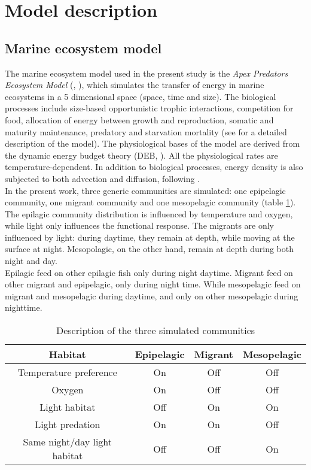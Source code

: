 \section{Model description}

\subsection{Marine ecosystem model}

The marine ecosystem model used in the present study is the \emph{Apex Predators Ecosystem Model} (\ap, \citealt{mauryModelingEnvironmentalEffects2007,mauryOverviewAPECOSMSpatialized2010}), which simulates 
the transfer of energy in marine ecosystems in a 5 dimensional space (space, time and size).
The biological processes include size-based opportunistic trophic interactions, competition for food, allocation of energy between growth and reproduction, somatic and maturity maintenance, predatory and starvation mortality (see \citealt{mauryModelingEnvironmentalEffects2007} for a detailed description of the model).
The physiological bases of the model are derived from the dynamic energy budget theory (DEB, \citealt{kooijmanDynamicEnergyMass2000}).
All the physiological rates are temperature-dependent.  In addition to biological processes, energy density 
is also subjected to both advection and diffusion, following \cite{faugerasAdvectiondiffusionreactionSizestructuredFish2005}.\\

In the present work, three generic communities are simulated: one epipelagic community, one migrant community and one mesopelagic community (table \ref{t:com-habitat}). 
The epilagic community distribution is influenced by temperature and oxygen, while light only influences the functional response. The 
migrants are only influenced by light: during daytime, they remain at depth, while moving at the 
surface at night. Mesopolagic, on the other hand, remain at depth during both night and day.\\

Epilagic feed on other epilagic fish only during night daytime. Migrant feed on other migrant and epipelagic, only during night time. While mesopelagic feed on migrant and mesopelagic during daytime, and only on other mesopelagic during nighttime. \\

\begin{table}
\begin{tabular}{cccc}
     Habitat & Epipelagic & Migrant & Mesopelagic \\
     \hline
     \hline
      Temperature preference & On & Off & Off\\
      Oxygen & On & Off & Off \\
      Light habitat & Off & On & On \\
      Light predation & On & On & Off \\
      Same night/day light habitat  & Off & Off & On \\
\end{tabular}
\caption{Description of the three simulated communities}
\label{t:com-habitat}
\end{table}


